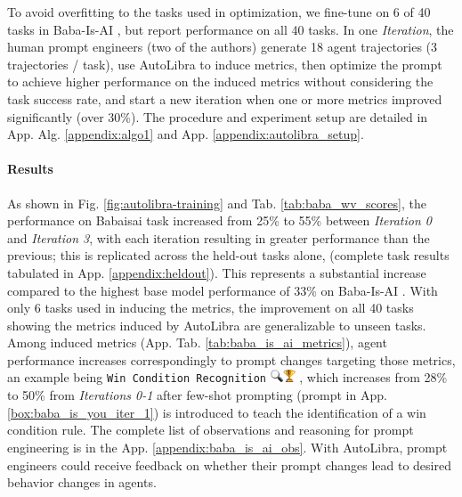 To avoid overfitting to the tasks used in optimization, we fine-tune on 6 of 40 tasks
in Baba-Is-AI \citep{paglieri2024balrog}, but report performance on all 40 tasks.
In one \textit{Iteration}, the human prompt engineers (two of the authors)
generate 18 agent trajectories (3 trajectories / task), use AutoLibra to induce metrics,
then optimize the prompt to achieve higher performance on the induced metrics
without considering the task success rate, and start a new iteration when one or
more metrics improved significantly (over 30\%). The procedure and experiment setup
are detailed in App. Alg. \ref{appendix:algo1} and App.
\ref{appendix:autolibra_setup}.
\vspace{-0.4cm}

\paragraph{Results}
As shown in Fig. \ref{fig:autolibra-training} and Tab. \ref{tab:baba_wv_scores},
the performance on Babaisai task increased from 25\% to 55\% between \textit{Iteration
0} and \textit{Iteration 3}, with each iteration resulting in greater performance
than the previous; this is replicated across the held-out tasks alone, (complete
task results tabulated in App. \ref{appendix:heldout}). This represents a substantial
increase compared to the highest base model performance of 33\% on Baba-Is-AI
\citep{paglieri2024balrog}. With only 6 tasks used in inducing the metrics, the improvement
on all 40 tasks showing the metrics induced by AutoLibra are generalizable to unseen
tasks. Among induced metrics (App. Tab. \ref{tab:baba_is_ai_metrics}), agent performance
increases correspondingly to prompt changes targeting those metrics, an example
being \texttt{Win Condition Recognition}
\includegraphics[height=1em]{figs/emojis/emoji_1.png}
, which increases from 28\% to 50\% from \textit{Iterations 0-1} after few-shot
prompting (prompt in App. \ref{box:baba_is_you_iter_1}) is introduced to teach the
identification of a win condition rule. The complete list of observations and
reasoning for prompt engineering is in the App. \ref{appendix:baba_is_ai_obs}.
With AutoLibra, prompt engineers could receive feedback on whether their prompt changes
lead to desired behavior changes in agents.

